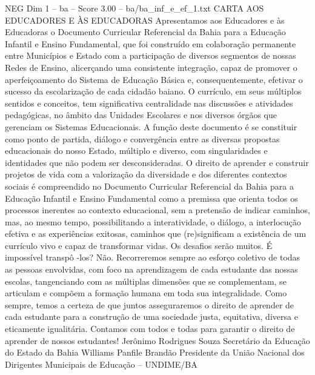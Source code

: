 \begin{textsample}{NEG Dim 1 – ba – Score 3.00 – ba/ba\_inf\_e\_ef\_1.txt}  \label{ex:f1_neg_183}
CARTA AOS EDUCADORES E ÀS EDUCADORAS Apresentamos aos Educadores e às Educadoras o Documento Curricular Referencial da Bahia para a Educação Infantil e Ensino Fundamental, que foi construído em colaboração permanente entre Municípios e Estado com a participação de diversos segmentos de nossas Redes de Ensino, alicerçando uma consistente integração, capaz de promover o aperfeiçoamento do Sistema de Educação Básica e, consequentemente, efetivar o sucesso da escolarização de cada cidadão baiano.
O currículo, em seus múltiplos sentidos e conceitos, tem significativa centralidade nas discussões e atividades pedagógicas, no âmbito das Unidades Escolares e nos diversos órgãos que gerenciam os Sistemas Educacionais.
A função deste documento é se constituir como ponto de partida, diálogo e convergência entre as diversas propostas educacionais do nosso Estado, múltiplo e diverso, com singularidades e identidades que não podem ser desconsideradas.
O direito de aprender e construir projetos de vida com a valorização da diversidade e dos diferentes contextos sociais é compreendido no Documento Curricular Referencial da Bahia para a Educação Infantil e Ensino Fundamental como a premissa que orienta todos os processos inerentes ao contexto educacional, sem a pretensão de indicar caminhos, mas, ao mesmo tempo, possibilitando a interatividade, o diálogo, a interlocução efetiva e as experiências exitosas, caminhos que (re)significam a existência de um currículo vivo e capaz de transformar vidas.
Os desafios serão muitos.
É impossível transpô -los?
Não.
Recorreremos sempre ao esforço coletivo de todas as pessoas envolvidas, com foco na aprendizagem de cada estudante das nossas escolas, tangenciando com as múltiplas dimensões que se complementam, se articulam e compõem a formação humana em toda sua integralidade.
Como sempre, temos a certeza de que juntos asseguraremos o direito de aprender de cada estudante para a construção de uma sociedade justa, equitativa, diversa e eticamente igualitária.
Contamos com todos e todas para garantir o direito de aprender de nossos estudantes!
Jerônimo Rodrigues Souza Secretário da Educação do Estado da Bahia Williams Panfile Brandão Presidente da União Nacional dos Dirigentes Municipais de Educação – UNDIME/BA

\end{textsample}
